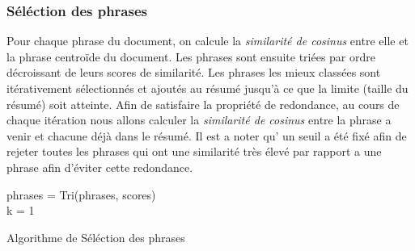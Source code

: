         \subsubsection{Séléction des phrases}
        Pour chaque phrase du document, on calcule la \emph{similarité de cosinus} entre elle et la phrase centroïde du document. Les phrases sont ensuite triées par ordre décroissant de leurs scores de similarité. Les phrases les mieux classées sont itérativement sélectionnés et ajoutés au résumé jusqu'à ce que la limite (taille du résumé) soit atteinte. Afin de satisfaire la propriété de redondance, au cours de chaque itération nous allons calculer la \emph{similarité de cosinus} entre la phrase a venir et chacune déjà dans le résumé.
        Il est a noter qu' un seuil a été fixé afin de rejeter toutes les phrases qui ont une similarité très élevé par rapport a une phrase afin d'éviter cette redondance.

        \begin{algorithm2e}[H]
            \SetAlgoLined
            
            phrases = Tri(phrases, scores)\\
            k = 1\\
            \caption{Algorithme de Séléction des phrases}
        \end{algorithm2e}

